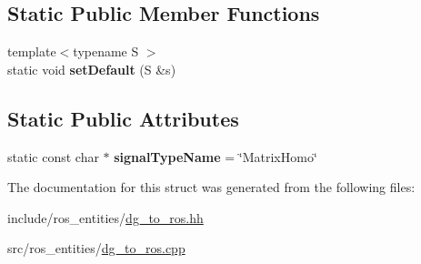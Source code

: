\subsection*{Static Public Member Functions}
\begin{DoxyCompactItemize}
\item 
\mbox{\label{structdynamic__graph_1_1DgToRos_3_01std_1_1pair_3_01MatrixHomogeneous_00_01Vector_01_4_01_4_ab5d21c1a813043c42b1444084d2001b5}} 
{\footnotesize template$<$typename S $>$ }\\static void {\bfseries set\+Default} (S \&s)
\end{DoxyCompactItemize}
\subsection*{Static Public Attributes}
\begin{DoxyCompactItemize}
\item 
\mbox{\label{structdynamic__graph_1_1DgToRos_3_01std_1_1pair_3_01MatrixHomogeneous_00_01Vector_01_4_01_4_a1d5bcd8801ebb4c87d4870ed195f01c2}} 
static const char $\ast$ {\bfseries signal\+Type\+Name} = \char`\"{}Matrix\+Homo\char`\"{}
\end{DoxyCompactItemize}


The documentation for this struct was generated from the following files\+:\begin{DoxyCompactItemize}
\item 
include/ros\+\_\+entities/\hyperlink{dg__to__ros_8hh}{dg\+\_\+to\+\_\+ros.\+hh}\item 
src/ros\+\_\+entities/\hyperlink{dg__to__ros_8cpp}{dg\+\_\+to\+\_\+ros.\+cpp}\end{DoxyCompactItemize}
